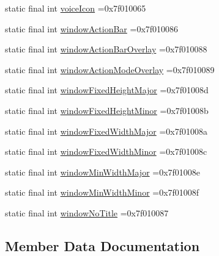 \begin{DoxyCompactItemize}
static final int \hyperlink{classcheck_1_1test_1_1_r_1_1attr_acbef98ffd0298aff57e4df6b3265f2f5}{voice\+Icon} =0x7f010065
\item 
static final int \hyperlink{classcheck_1_1test_1_1_r_1_1attr_a8acf10ee7b5c99830207704fc5046ebd}{window\+Action\+Bar} =0x7f010086
\item 
static final int \hyperlink{classcheck_1_1test_1_1_r_1_1attr_a19fa3f87e323234548344c5e54c84a14}{window\+Action\+Bar\+Overlay} =0x7f010088
\item 
static final int \hyperlink{classcheck_1_1test_1_1_r_1_1attr_a29b4d3e415a1c7f9c6528fc82443932a}{window\+Action\+Mode\+Overlay} =0x7f010089
\item 
static final int \hyperlink{classcheck_1_1test_1_1_r_1_1attr_a117326070fd6496640c70afd9d2eef7a}{window\+Fixed\+Height\+Major} =0x7f01008d
\item 
static final int \hyperlink{classcheck_1_1test_1_1_r_1_1attr_af64ced39b1ccba05a90dd6826cc30e0c}{window\+Fixed\+Height\+Minor} =0x7f01008b
\item 
static final int \hyperlink{classcheck_1_1test_1_1_r_1_1attr_a9cff73eb6499ce956f00b5e14b6b15fc}{window\+Fixed\+Width\+Major} =0x7f01008a
\item 
static final int \hyperlink{classcheck_1_1test_1_1_r_1_1attr_a7a67f15de710341d2d449dc94d1f781d}{window\+Fixed\+Width\+Minor} =0x7f01008c
\item 
static final int \hyperlink{classcheck_1_1test_1_1_r_1_1attr_ad36e3ab0bb3027c715b3ab1e256f0def}{window\+Min\+Width\+Major} =0x7f01008e
\item 
static final int \hyperlink{classcheck_1_1test_1_1_r_1_1attr_acc028cfe18328eb830afb880f3d7b3ad}{window\+Min\+Width\+Minor} =0x7f01008f
\item 
static final int \hyperlink{classcheck_1_1test_1_1_r_1_1attr_a29fbabdf31581c8b92ca157f7379b0c4}{window\+No\+Title} =0x7f010087
\end{DoxyCompactItemize}


\subsection{Member Data Documentation}
\hypertarget{classcheck_1_1test_1_1_r_1_1attr_a231d531e25674903c0fc051027b53e1f}{}
